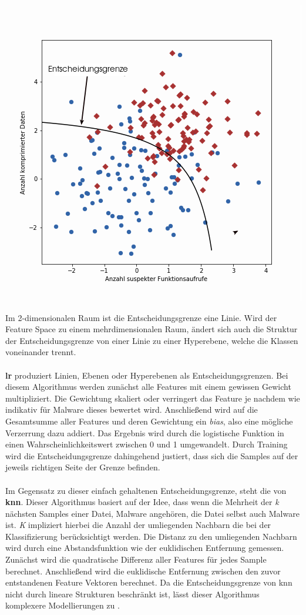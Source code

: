 \documentclass[
    12pt, %
    DIV10,
    ngerman, %
    a4paper, %
    oneside, %
    titlepage, %
    parskip=half, %
    headings=normal, %
    listof=totoc, %
    bibliography=totoc, %
    index=totoc, %
    captions=tableheading, %
    final %
]{scrreprt}
\begin{document}
\begin{center}
\includegraphics[scale=0.6]{img/db.png}
\label{fig:db}
\end{center}
Im 2-dimensionalen Raum ist die Entscheidungsgrenze eine Linie. Wird der Feature Space zu einem mehrdimensionalen Raum, ändert sich auch die Struktur der Entscheidungsgrenze von einer Linie zu einer Hyperebene, welche die Klassen voneinander trennt.\\\\
\textbf{\acl{lr}} produziert Linien, Ebenen oder Hyperebenen als Entscheidungsgrenzen. Bei diesem Algorithmus werden zunächst alle Features mit einem gewissen Gewicht multipliziert. Die Gewichtung skaliert oder verringert das Feature je nachdem wie indikativ für Malware dieses bewertet wird. Anschlie{\ss}end wird auf die Gesamtsumme aller Features und deren Gewichtung ein \emph{bias}, also eine mögliche Verzerrung dazu addiert. Das Ergebnis wird durch die logistische Funktion in einen Wahrscheinlichkeitswert zwischen 0 und 1 umgewandelt. Durch Training wird die Entscheidungsgrenze dahingehend justiert, dass sich die Samples auf der jeweils richtigen Seite der Grenze befinden.\\\\
Im Gegensatz zu dieser einfach gehaltenen Entscheidungsgrenze, steht die von \textbf{\acl{knn}}. Dieser Algorithmus basiert auf der Idee, dass wenn die Mehrheit der \emph{k} nächsten Samples einer Datei, Malware angehören, die Datei selbst auch Malware ist. \emph{K} impliziert hierbei die Anzahl der umliegenden Nachbarn die bei der Klassifizierung berücksichtigt werden. Die Distanz zu den umliegenden Nachbarn wird durch eine Abstandsfunktion wie der euklidischen Entfernung gemessen. Zunächst wird die quadratische Differenz aller Features für jedes Sample berechnet. Anschlie{\ss}end wird die euklidische Entfernung zwischen den zuvor entstandenen Feature Vektoren berechnet. Da die Entscheidungsgrenze von \ac{knn} nicht durch lineare Strukturen beschränkt ist, lässt dieser Algorithmus komplexere Modellierungen zu \parencite{JoshuaSaxe2018}.
\end{document}
